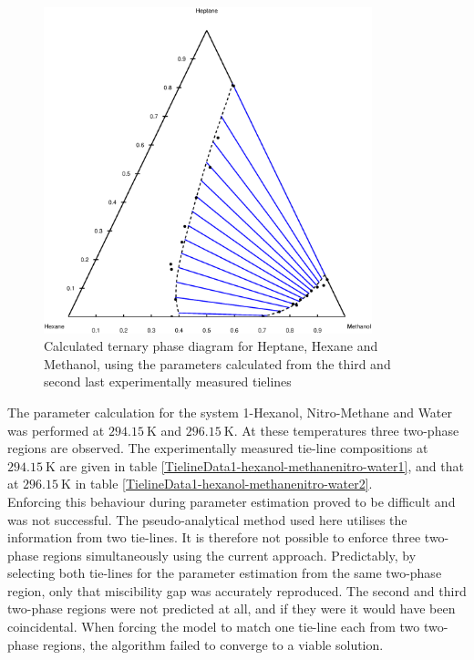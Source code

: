 \begin{figure}[h]
\centering
\includegraphics[width = 0.85\textwidth]{Results_Parts/TernaryParams/heptane-hexane-methanol/DWPMTieline3and-2/CalculatedPhaseDiagram.eps}
\caption{Calculated ternary phase diagram for Heptane, Hexane and Methanol, using the parameters calculated from the third and second last experimentally measured tielines} \label{heptane-hexane-methanolFigure2}
\end{figure}	
\clearpage


The parameter calculation for the system 1-Hexanol, Nitro-Methane and Water was performed at $294.15~\mathrm{K}$ and $296.15~\mathrm{K}$. At these temperatures three two-phase regions are observed. The experimentally measured tie-line compositions at $294.15~\mathrm{K}$ are given in table \ref{TielineData1-hexanol-methanenitro-water1}, and that at $296.15~\mathrm{K}$ in table \ref{TielineData1-hexanol-methanenitro-water2}.\\

Enforcing this behaviour during parameter estimation proved to be difficult and was not successful. The pseudo-analytical method used here utilises the information from two tie-lines. It is therefore not possible to enforce three two-phase regions simultaneously using the current approach. Predictably, by selecting both tie-lines for the parameter estimation from the same two-phase region, only that miscibility gap was accurately reproduced. The second and third two-phase regions were not predicted at all, and if they were it would have been coincidental. When forcing the model to match one tie-line each from two two-phase regions, the algorithm failed to converge to a viable solution.\\

